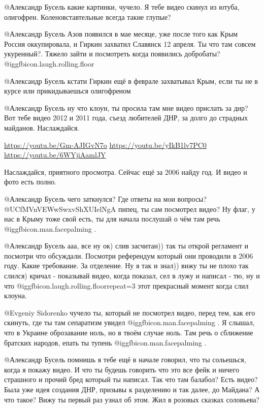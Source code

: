 \begin{multicols}{2}
\begin{itemize}
@Александр Бусель  какие картинки, чучело. Я тебе видео скинул из ютуба,
олигофрен. Коленовставтельные всегда такие глупые?


@Александр Бусель  Азов появился в мае месяце, уже после того как Крым Россия
оккупировала, и Гиркин захватил Славянск 12 апреля. Ты что там совсем
укуренный?. Тяжело зайти и посмотреть когда появились добробаты? @igg{fbicon.laugh.rolling.floor} 


@Александр Бусель  кстати Гиркин ещё в феврале захватывал Крым, если ты не в
курсе или прикидываешься олигофреном


@Александр Бусель   ну что клоун, ты просила там мне видео прислать за днр?
Вот тебе видео 2012 и 2011 года, съезд любителей ДНР, за долго до страдных
майданов. Наслаждайся. 

\url{https://youtu.be/Gm-AJIGvN7o}
\url{https://youtu.be/yIkB1lv7PC0}
\url{https://youtu.be/6WYjiAamlJY}

Наслаждайся, приятного просмотра. Сейчас ещё за 2006 найду год. И видео и фото
есть полно. 

 @Александр Бусель  чего заткнулся? Где ответы на мои вопросы?
@UCfMVnVEWwSwxvShXUIelNgA пипец, ты сам посмотрел видео? Ну флаг, у нас в Крыму тоже свой есть, ты для начала послушай о чём там речь  @igg{fbicon.man.facepalming} .

@Александр Бусель   ааа, все ну ок) слив засчитан)) так ты открой регламент и
посмотри что обсуждали. Посмотри референдум который они проводили в 2006 году.
Какие требование. За отделение. Ну я так и знал)) вижу ты не плохо так слился)
кричал - показывай видео, когда показал, сел в лужу и написал - тю, ну и
что @igg{fbicon.laugh.rolling.floor}{repeat=3}  этот прекрасный момент когда слил клоуна. 


@Evgeniy Sidorenko  чучело ты, который не посмотрел видео, перед тем, как его
скинуть, где ты там сепаратизм увидел  @igg{fbicon.man.facepalming} . Я слышал, что в Украине
оброзавание ноль, но в твоём случае ноль. Там речь о сближение братских
народов, епать ты тупень  @igg{fbicon.man.facepalming} .


@Александр Бусель  помнишь я тебе ещё в начале говорил, что ты сольешься,
когда я покажу видео. И что ты будешь говорить что это все фейк и ничего
страшного и прочий бред который ты написал. Так что там балабол? Есть видео?
Была уже идея создания ДНР, призывы к разделению и так далее, до Майдана? А
что такое? Вижу ты первый раз узнал об этом. Жил в розовых сказках соловьева?


\end{itemize}
\end{multicols}
